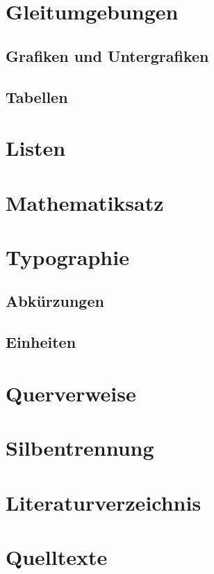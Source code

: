 \documentclass[english,ngerman]{tudscrartcl}
\begin{document}
\section{Gleitumgebungen}
\label{sec:floats}

\subsection{Grafiken und Untergrafiken}

\subsection{Tabellen}


\section{Listen}


\section{Mathematiksatz}


\section{Typographie}

\subsection{Abkürzungen}

\subsection{Einheiten}


\section{Querverweise}


\section{Silbentrennung}


\section{Literaturverzeichnis}


\section{Quelltexte}
\end{document}
